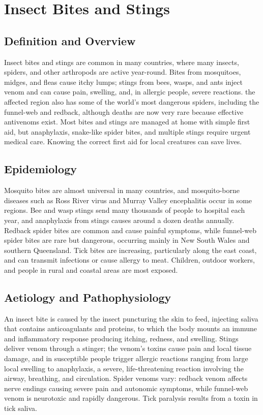 \chapter{Insect Bites and Stings}

\section*{Definition and Overview}
Insect bites and stings are common in many countries, where many insects, spiders, and other arthropods are active year-round. Bites from mosquitoes, midges, and fleas cause itchy lumps; stings from bees, wasps, and ants inject venom and can cause pain, swelling, and, in allergic people, severe reactions. the affected region also has some of the world's most dangerous spiders, including the funnel-web and redback, although deaths are now very rare because effective antivenoms exist. Most bites and stings are managed at home with simple first aid, but anaphylaxis, snake-like spider bites, and multiple stings require urgent medical care. Knowing the correct first aid for local creatures can save lives.

\section*{Epidemiology}
Mosquito bites are almost universal in many countries, and mosquito-borne diseases such as Ross River virus and Murray Valley encephalitis occur in some regions. Bee and wasp stings send many thousands of people to hospital each year, and anaphylaxis from stings causes around a dozen deaths annually. Redback spider bites are common and cause painful symptoms, while funnel-web spider bites are rare but dangerous, occurring mainly in New South Wales and southern Queensland. Tick bites are increasing, particularly along the east coast, and can transmit infections or cause allergy to meat. Children, outdoor workers, and people in rural and coastal areas are most exposed.

\section*{Aetiology and Pathophysiology}
An insect bite is caused by the insect puncturing the skin to feed, injecting saliva that contains anticoagulants and proteins, to which the body mounts an immune and inflammatory response producing itching, redness, and swelling. Stings deliver venom through a stinger; the venom's toxins cause pain and local tissue damage, and in susceptible people trigger allergic reactions ranging from large local swelling to anaphylaxis, a severe, life-threatening reaction involving the airway, breathing, and circulation. Spider venoms vary: redback venom affects nerve endings causing severe pain and autonomic symptoms, while funnel-web venom is neurotoxic and rapidly dangerous. Tick paralysis results from a toxin in tick saliva.

